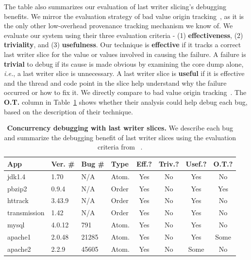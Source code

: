 \documentclass[preprint,9pt]{sigplanconf}
\begin{document}
The table also summarizes our evaluation of last writer slicing's debugging
benefits.  We mirror the evaluation strategy of bad value origin
tracking~\cite{badapples}, as it is the only other low-overhead provenance
tracking mechanism we know of.  We evaluate our system using their three
evaluation criteria - (1) {\bf effectiveness}, (2) {\bf triviality}, and (3)
{\bf usefulness}.  Our technique is {\bf effective} if it tracks a correct last
writer slice for the value or values involved in causing the failure.  A failure is {\bf
trivial} to debug if its cause is made obvious by examining the core dump
alone, {\em i.e.}, a last writer slice is unnecessary.  A last writer slice is
{\bf useful} if it is effective and the thread and code point in the slice help
understand why the failure occurred or how to fix it.   We directly compare to
bad value origin tracking~\cite{badapples}.    The {\bf O.T.} column in Table~\ref{tab:bugs}
shows  whether their analysis could help debug each bug, based on the
description of their technique.

\begin{table}
\scriptsize
\centering
\begin{tabular}{l|ll|l|ccc|c}
{\bf App} & {\bf Ver. \#} & {\bf Bug \#} &{\bf Type} & {\bf Eff.?} & {\bf Triv.?} & {\bf Usef.?} & {\bf O.T.?}\\ \hline
jdk1.4 &  1.70   &  N/A     & Atom.  &Yes  &No    &Yes   & No  \\%
pbzip2 &  0.9.4  &  N/A     & Order  &Yes  &No    &Yes   & Yes \\
httrack& 3.43.9  &  N/A     & Order  &Yes  &No    &Yes   & No  \\%
transmission & 1.42 & N/A   & Order  &Yes  &No    &Yes   & No  \\
mysql  &  4.0.12 &  791     & Atom.  &Yes  &No    &Yes   & No  \\%
apache1&  2.0.48 &  21285   & Atom.  &Yes  &No    &Yes   & Some \\%
apache2&  2.2.9 &  45605    & Atom.  &Yes  &No    &Some  & No \\%
\end{tabular}
\caption{\label{tab:bugs}{\bf Concurrency debugging with last writer slices.} We describe each bug and summarize the debugging benefit of last writer slices using the evaluation criteria from ~\cite{badapples}.  }
\normalsize
\end{table}
\end{document}
